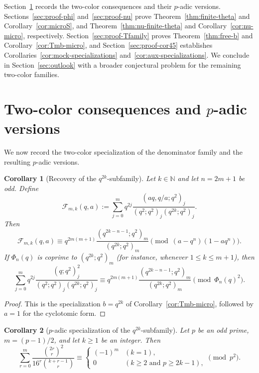 \documentclass[reqno]{amsart}
\theoremstyle{definition}
\theoremstyle{plain}
\newtheorem{corollary}{Corollary}
\theoremstyle{remark}
\numberwithin{equation}{section}
\begin{document}
Section~\ref{sec:twocolor} records the two-color consequences and their $p$-adic versions. Sections~\ref{sec:proof-phi} and~\ref{sec:proof-nu} prove Theorem~\ref{thm:finite-theta} and Corollary~\ref{cor:microS}, and Theorem~\ref{thm:nu-finite-theta} and Corollary~\ref{cor:nu-micro}, respectively. Section~\ref{sec:proof-Tfamily} proves Theorem~\ref{thm:free-b} and Corollary~\ref{cor:Tmb-micro}, and Section~\ref{sec:proof-cor45} establishes Corollaries~\ref{cor:mock-specializations} and~\ref{cor:aux-specializations}. We conclude in Section~\ref{sec:outlook} with a broader conjectural problem for the remaining two-color families.

\section{Two-color consequences and \texorpdfstring{$p$}{p}-adic versions}\label{sec:twocolor}

We now record the two-color specialization of the denominator family and the resulting $p$-adic versions.

\begin{corollary}[Recovery of the $q^{2k}$-subfamily]\label{cor:Fk}
Let $k\in\mathbb{N}$ and let $n=2m+1$ be odd. Define
\begin{equation}\label{eq:Fmk}
\mathcal{F}_{m,k}(q,a):=\sum_{j=0}^{m} q^{2j}\frac{(aq,q/a;q^2)_j}{(q^2;q^2)_j(q^{2k};q^2)_j}.
\end{equation}
Then
\begin{equation}\label{eq:Fk-micro-new}
\mathcal{F}_{m,k}(q,a)
\equiv q^{2m(m+1)}\frac{(q^{2k-n-1};q^2)_m}{(q^{2k};q^2)_m}
\pmod{(a-q^n)(1-aq^n)}.
\end{equation}
If $\Phi_n(q)$ is coprime to $(q^{2k};q^2)_m$ (for instance, whenever $1\le k\le m+1$), then
\begin{equation}\label{eq:Fk-phi2-new}
\sum_{j=0}^{m} q^{2j}\frac{(q;q^2)_j^2}{(q^2;q^2)_j(q^{2k};q^2)_j}
\equiv q^{2m(m+1)}\frac{(q^{2k-n-1};q^2)_m}{(q^{2k};q^2)_m}
\pmod{\Phi_n(q)^2}.
\end{equation}
\end{corollary}

\begin{proof}
This is the specialization $b=q^{2k}$ of Corollary~\ref{cor:Tmb-micro}, followed by $a=1$ for the cyclotomic form.
\end{proof}

\begin{corollary}[$p$-adic specialization of the $q^{2k}$-subfamily]\label{cor:padic-k}
Let $p$ be an odd prime, $m=(p-1)/2$, and let $k\ge 1$ be an integer. Then
\begin{equation}\label{eq:padic}
\sum_{r=0}^{m}\frac{\binom{2r}{r}^2}{16^r\binom{k+r-1}{r}}
\equiv
\begin{cases}
(-1)^m & (k=1),\\
0 & (k\ge 2 \text{ and } p\ge 2k-1),
\end{cases}
\pmod{p^2}.
\end{equation}
\end{corollary}
\end{document}
